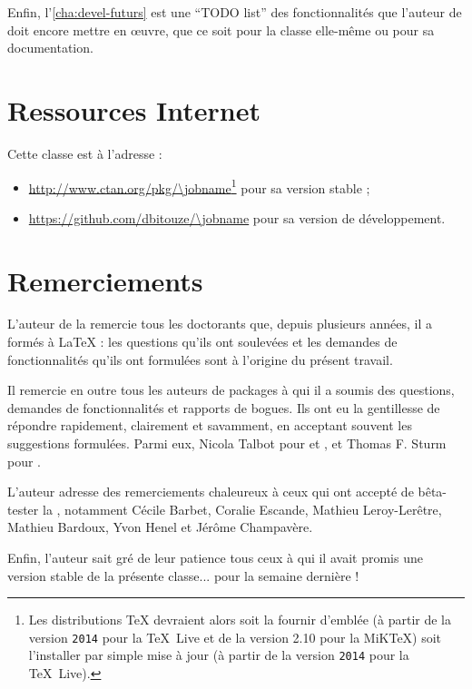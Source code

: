 Enfin, l'\vref{cha:devel-futurs} est une \foreignquote{english}{TODO list} des
fonctionnalités que l'auteur de \yat{} doit encore mettre en œuvre, que ce soit
pour la classe elle-même ou pour sa documentation.

\section{Ressources Internet}
\label{sec:ressources-internet}

Cette classe est  à l'adresse :
\begin{itemize}
\item \url{http://www.ctan.org/pkg/\jobname}\footnote{Les distributions \TeX{}
    devraient alors soit la fournir d'emblée (à partir de la version
    \texttt{2014} pour la \TeX~Live et de la version 2.10 pour la MiK\TeX{})
    soit l'installer par simple mise à jour (à partir de la version
    \texttt{2014} pour la \TeX~Live).}  pour sa version stable ;
\item \url{https://github.com/dbitouze/\jobname} pour sa version de
  développement.
\end{itemize}

\section{Remerciements}
\label{sec:remerciements}

L'auteur de la \yatcl{} remercie tous les doctorants que, depuis plusieurs
années, il a formés à \LaTeX{} : les questions qu'ils ont soulevées et les
demandes de fonctionnalités qu'ils ont formulées sont à l'origine du présent
travail.

Il remercie en outre tous les auteurs de packages à qui il a soumis  des questions, demandes de fonctionnalités et
rapports de bogues. Ils ont eu la gentillesse de répondre rapidement,
clairement et savamment, en acceptant souvent les suggestions formulées. Parmi
eux, Nicola Talbot pour  et , et Thomas
F. Sturm pour .

L'auteur adresse des remerciements chaleureux à ceux qui ont accepté de
bêta-tester la \yatcl{}, notamment Cécile Barbet, Coralie Escande, Mathieu
Leroy-Lerêtre, Mathieu Bardoux, Yvon Henel et Jérôme Champavère.

Enfin, l'auteur sait gré de leur patience tous ceux à qui il avait promis une
version stable de la présente classe... pour la semaine dernière !

%
\iffalse
\fi
